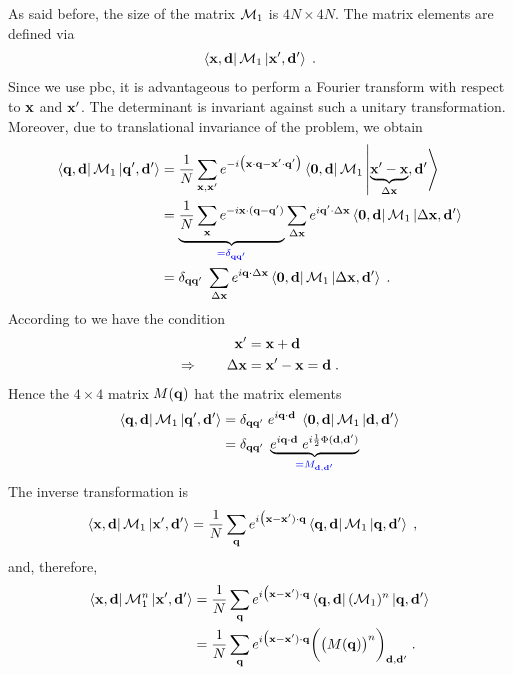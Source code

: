 As said before, the size of the matrix ${\cal M}_{1}$ is $4N\times 4N$. The matrix elements are defined via
%
\begin{align*}
\bra{\mathbf x,\mathbf d} \mathcal{M}_{1}\ket{\mathbf x',\mathbf d'}\;.
\end{align*}
%
Since we use pbc, it is advantageous to perform a Fourier transform with respect to $\mathbf x$ and 
$\mathbf x'$. The determinant is invariant against such a unitary transformation. Moreover, due to
translational invariance of the problem, we obtain
%
\begin{align*}
\bra{\mathbf q,\mathbf d} \mathcal{M}_{1}\ket{\mathbf q',\mathbf d'}&=
\frac{1}{N}\sum_{\mathbf x,\mathbf x'} e^{-i\big(\mathbf x\cdot \mathbf q-\mathbf x'\cdot \mathbf q'\big)}
\bra{\mathbf 0,\mathbf d} \mathcal{M}_{1}\ket{\underbrace{\mathbf x'-\mathbf x}_{\Delta\mathbf x},\mathbf d'}\\
&= \underbrace{
\frac{1}{N}\sum_{\mathbf x} e^{-i\mathbf x\cdot (\mathbf q-\mathbf q')}
}_{\color{blue} = \delta_{\mathbf q\mathbf q'}}\sum_{\Delta\mathbf x} e^{i \mathbf q'\cdot\Delta \mathbf x}
\bra{\mathbf 0,\mathbf d} \mathcal{M}_{1}\ket{\Delta\mathbf x,\mathbf d'}\\
&= \delta_{\mathbf q\mathbf q'}\;\sum_{\Delta\mathbf x} e^{i \mathbf q\cdot\Delta \mathbf x}
\bra{\mathbf 0,\mathbf d} \mathcal{M}_{1}\ket{\Delta\mathbf x,\mathbf d'}\;.
\end{align*}
%
According to  we have the condition 
%
\begin{align*}
\mathbf x' &= \mathbf x +\mathbf d\\
\Rightarrow\qquad \Delta \mathbf x &= \mathbf x' -\mathbf x = \mathbf d\;.
\end{align*}
%
Hence the $4\times 4$ matrix $M(\mathbf q)$ hat the matrix elements
%
\begin{align*}
\bra{\mathbf q,\mathbf d} \mathcal{M}_{1}\ket{\mathbf q',\mathbf d'}
&= \delta_{\mathbf q\mathbf q'}\; 
e^{i \mathbf q\cdot\mathbf d}\;
\bra{\mathbf 0,\mathbf d} \mathcal{M}_{1}\ket{\mathbf d,\mathbf d'}\\
&= \delta_{\mathbf q\mathbf q'}\; 
\underbrace{
e^{i \mathbf q\cdot\mathbf d}\;
e^{i\frac{1}{2}\Phi(\mathbf d,\mathbf d')}
}_{\color{blue} = M_{\mathbf d,\mathbf d'}}\\
\end{align*}
%
The inverse transformation is
%
\begin{align*}
\bra{\mathbf x,\mathbf d} \mathcal{M}_{1}\ket{\mathbf x',\mathbf d'}&=\frac{1}{N}
\sum_{\mathbf q} e^{i\big(\mathbf x-\mathbf x')\cdot \mathbf q }
\bra{\mathbf q,\mathbf d} \mathcal{M}_{1} \ket{\mathbf q,\mathbf d'}\;,
\end{align*}
%
and, therefore, 
%
\begin{align*}
\bra{\mathbf x,\mathbf d} \mathcal{M}_{1}^{n}\ket{\mathbf x',\mathbf d'}&=\frac{1}{N}
\sum_{\mathbf q} e^{i\big(\mathbf x-\mathbf x')\cdot \mathbf q }
\bra{\mathbf q,\mathbf d} (\mathcal{M}_{1})^{n} \ket{\mathbf q,\mathbf d'}\\
&=\frac{1}{N}
\sum_{\mathbf q} e^{i\big(\mathbf x-\mathbf x')\cdot \mathbf q }
\bigg(\big( M(\mathbf q) \big)^{n}\bigg)_{\mathbf d,\mathbf d'}\;.
\end{align*}
%

